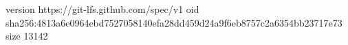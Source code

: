 version https://git-lfs.github.com/spec/v1
oid sha256:4813a6e0964ebd7527058140efa28dd459d24a9f6eb8757c2a6354bb23717e73
size 13142
